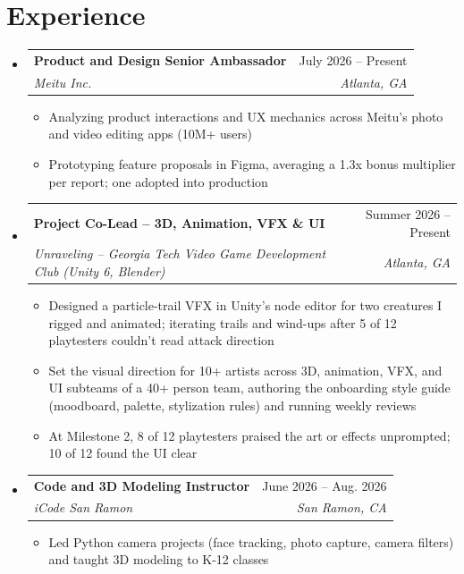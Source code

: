 \documentclass[letterpaper,11pt]{article}
\makeatletter
\newcommand{\resumeItem}[1]{
  \item\small{
    {#1 \vspace{-2pt}}
  }
}
\newcommand{\resumeSubheading}[4]{
  \vspace{-2pt}\item
    \begin{tabular*}{0.97\textwidth}[t]{l@{\extracolsep{\fill}}r}
      \textbf{#1} & #2 \\
      \textit{\small#3} & \textit{\small #4} \\
    \end{tabular*}\vspace{-7pt}
}
\newcommand{\resumeSubHeadingListStart}{\begin{itemize}[leftmargin=0.15in, label={}]}
\newcommand{\resumeSubHeadingListEnd}{\end{itemize}}
\newcommand{\resumeItemListStart}{\begin{itemize}}
\newcommand{\resumeItemListEnd}{\end{itemize}\vspace{-5pt}}
\makeatother
\begin{document}
\section{Experience}
  \resumeSubHeadingListStart

    \resumeSubheading
      {Product and Design Senior Ambassador}{July 2026 -- Present}
      {Meitu Inc.}{Atlanta, GA}
      \resumeItemListStart
        \resumeItem{Analyzing product interactions and UX mechanics across Meitu's photo and video editing apps (10M+ users)}
        \resumeItem{Prototyping feature proposals in Figma, averaging a 1.3x bonus multiplier per report; one adopted into production}
      \resumeItemListEnd

    \resumeSubheading
      {Project Co-Lead -- 3D, Animation, VFX \& UI}{Summer 2026 -- Present}
      {Unraveling -- Georgia Tech Video Game Development Club (Unity 6, Blender)}{Atlanta, GA}
      \resumeItemListStart
        \resumeItem{Designed a particle-trail VFX in Unity's node editor for two creatures I rigged and animated; iterating trails and wind-ups after 5 of 12 playtesters couldn't read attack direction}
        \resumeItem{Set the visual direction for 10+ artists across 3D, animation, VFX, and UI subteams of a 40+ person team, authoring the onboarding style guide (moodboard, palette, stylization rules) and running weekly reviews}
        \resumeItem{At Milestone 2, 8 of 12 playtesters praised the art or effects unprompted; 10 of 12 found the UI clear}
      \resumeItemListEnd

    \resumeSubheading
      {Code and 3D Modeling Instructor}{June 2026 -- Aug. 2026}
      {iCode San Ramon}{San Ramon, CA}
      \resumeItemListStart
        \resumeItem{Led Python camera projects (face tracking, photo capture, camera filters) and taught 3D modeling to K-12 classes}
      \resumeItemListEnd

  \resumeSubHeadingListEnd


\end{document}
